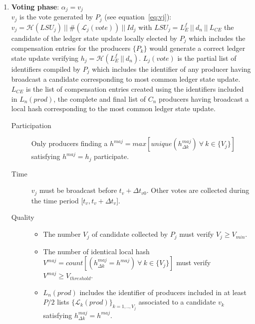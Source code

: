 \begin{enumerate}
\item \textbf{Voting phase}: $\alpha_j = v_j$\\
$v_j$ is the vote generated by $P_j$ (see equation~\ref{eq:vj}): $v_j = \mathcal{H}(LSU_j)~||~\#(\mathcal{L}_j(vote))~||~Id_j$ with $LSU_j = L^f_E~||~d_n~||~L_{CE}$ the candidate of the ledger state update locally elected by $P_j$ which includes the compensation entries for the producers $\{P_k\}$ would generate a correct ledger state update verifying $h_j = \mathcal{H}(L^f_E~||~d_n)$. $L_j(vote)$ is the partial list of identifiers compiled by $P_j$ which includes the identifier of any producer having broadcast a candidate corresponding to most common ledger state update. $L_{CE}$ is the list of compensation entries created using the identifiers included in $L_n(prod)$, the complete and final list of $C_n$ producers having broadcast a local hash corresponding to the most common ledger state update.  
\begin{description}
\item[Participation] Only producers finding a $h^{maj} = max[unique(h^{maj}_{\Delta k})~\forall~k\in\{V_j\}]$ satisfying $h^{maj} = h_j$ participate.
\item[Time] $v_j$ must be broadcast before $t_v + \Delta t_{v0}$. Other votes are collected during the time period [$t_v, t_v + \Delta t_{v}$].
\item[Quality] 
\begin{itemize}
\item The number $V_j$ of candidate collected by $P_j$ must verify $V_j \geq V_{min}$.
\item The number of identical local hash $V^{maj} = count[(h^{maj}_{\Delta k} = h^{maj})~\forall~k\in\{V_j\}]$ must verify $V^{maj} \geq V_{threshold}$.
\item $L_n(prod)$ includes the identifier of producers included in at least $P/2$ lists $\{\mathcal{L}_{k}(prod)\}_{k=1,..,V_j}$ associated to a candidate $v_{k}$ satisfying $h^{maj}_{\Delta k} = h^{maj}$.
\end{itemize}
\end{description}


\end{enumerate}
